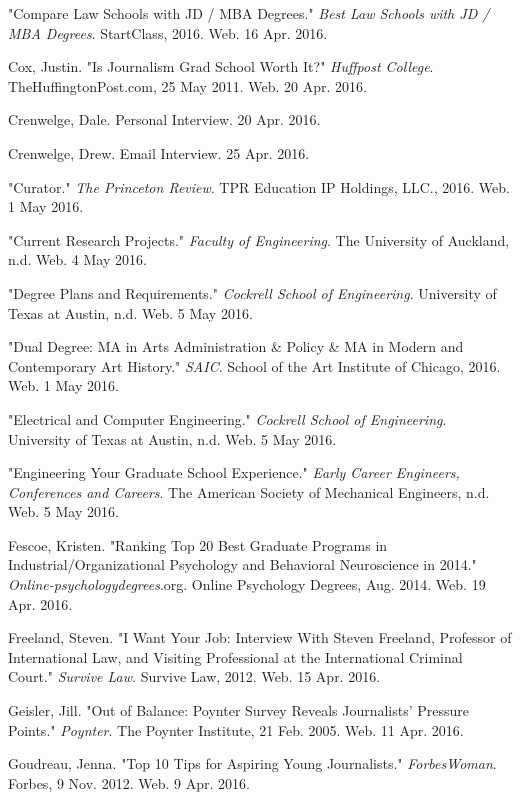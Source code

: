 \begin{workscited}
\begin{flushleft}
\bibent
"Compare Law Schools with JD / MBA Degrees." \textit{Best Law Schools with JD / MBA Degrees}. 
StartClass, 2016. Web. 16 Apr. 2016.

\bibent
Cox, Justin. "Is Journalism Grad School Worth It?" \textit{Huffpost College}. TheHuffingtonPost.com, 
25 May 2011. Web. 20 Apr. 2016.

\bibent
Crenwelge, Dale. Personal Interview. 20 Apr. 2016.

\bibent
Crenwelge, Drew. Email Interview. 25 Apr. 2016.

\bibent
"Curator." \textit{The Princeton Review}. TPR Education IP Holdings, LLC., 2016. Web. 1 May 2016.

\bibent
"Current Research Projects." \textit{Faculty of Engineering}. The University of Auckland, n.d. Web. 4
May 2016.

\bibent
"Degree Plans and Requirements." \textit{Cockrell School of Engineering}. University of Texas at
Austin, n.d. Web. 5 May 2016.

\bibent
"Dual Degree: MA in Arts Administration \& Policy \& MA in Modern and Contemporary Art 
History." \textit{SAIC}. School of the Art Institute of Chicago, 2016. Web. 1 May 2016.

\bibent
"Electrical and Computer Engineering." \textit{Cockrell School of Engineering}. University of Texas at Austin, n.d. Web. 5 May 2016.

\bibent
"Engineering Your Graduate School Experience." \textit{Early Career Engineers, Conferences and Careers}. The American Society of Mechanical Engineers, n.d. Web. 5 May 2016.

\bibent
Fescoe, Kristen. "Ranking Top 20 Best Graduate Programs in Industrial/Organizational 			Psychology and Behavioral Neuroscience in 2014." \textit{Online-psychologydegrees}.org. 		Online Psychology Degrees, Aug. 2014. Web. 19 Apr. 2016.

\bibent
Freeland, Steven. "I Want Your Job: Interview With Steven Freeland, Professor of International 
Law, and Visiting Professional at the International Criminal Court." \textit{Survive Law}. Survive Law, 2012. Web. 15 Apr. 2016. 

\bibent
Geisler, Jill. "Out of Balance: Poynter Survey Reveals Journalists’ Pressure Points." \textit{Poynter}. 	
The Poynter Institute, 21 Feb. 2005. Web. 11 Apr. 2016.

\bibent
Goudreau, Jenna. "Top 10 Tips for Aspiring Young Journalists." \textit{ForbesWoman}. Forbes, 9 Nov. 	
2012. Web. 9 Apr. 2016.


\end{flushleft}
\end{workscited}

